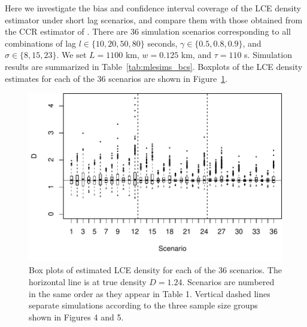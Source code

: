 \documentclass[useAMS, usenatbib, referee]{biom}\usepackage[]{graphicx}\usepackage[]{color}
\makeatletter
\def\maxwidth{ %
  \ifdim\Gin@nat@width>\linewidth
    \linewidth
  \else
    \Gin@nat@width
  \fi
}
\newenvironment{knitrout}{}{} %
\makeatother
\begin{document}
Here we investigate the bias and confidence interval coverage of the LCE density estimator under short lag scenarios, and compare them with those obtained from the CCR estimator of \cite{Stevenson+al:19}. There are 36 simulation scenarios corresponding to all combinations of lag $l \in \{ 10, 20, 50, 80\}$ seconds,  $\gamma \in\{ 0.5, 0.8, 0.9 \}$, and $\sigma\in\{ 8, 15, 23\}$. We set $L = 1100$ km, $w = 0.125$ km, and $\tau = 110$ s. Simulation results are summarized in Table~\ref{tab:mlesims_bcs}. Boxplots of the LCE density estimates for each of the 36 scenarios are shown in Figure~\ref{fig:fig_boxplots_bcs}.


\begin{knitrout}
\color{fgcolor}\begin{figure}

{\centering \includegraphics[width=\maxwidth]{figs/fig_boxplots_bcs-1} 

}

\caption[Box plots of estimated LCE density for each of the 36 scenarios]{Box plots of estimated LCE density for each of the 36 scenarios. The horizontal line is at true density \(D=1.24\). Scenarios are numbered in the same order as they appear in Table 1. Vertical dashed lines separate simulations according to the three sample size groups shown in Figures 4 and 5.}\label{fig:fig_boxplots_bcs}
\end{figure}


\end{knitrout}
\end{document}
